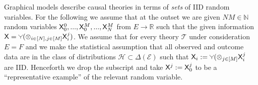 

Graphical models describe causal theories in terms of \emph{sets} of IID random variables. For the following we assume that at the outset we are given $NM\in\mathbb{N}$ random variables $\mathsf{X}^0_0,...,\mathsf{X}^M_0,...,\mathsf{X}^M_N$ from $E\to \mathbb{R}$ such that the given information $\RV{X}=\splitter{0.1}(\otimes_{i\in[N],j\in[M]} \RV{X}^j_i)$. We assume that for every theory $\mathscr{T}$ under consideration $E=F$ and we make the statistical assumption that all observed and outcome data are in the class of distributions $\mathscr{H}\subset\Delta(\mathcal{E})$ such that $\RV{X}_i:=\splitter{0.1}(\otimes_{j\in [M]} \RV{X}_i^j$ are IID. Henceforth we drop the subscript and take $\mathsf{X}^j:=\mathsf{X}^j_0$ to be a ``representative example'' of the relevant random variable.

